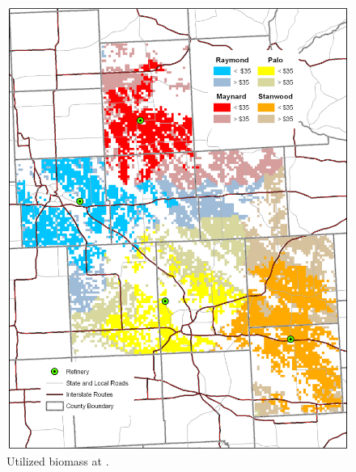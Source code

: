 \documentclass{elsart}
\begin{document}
\begin{figure}[hpt]
  \centering
  \includegraphics[width=1.0\textwidth]{farm_costs_35dollar_divide.png}  
  \caption{Utilized biomass at . }
  \label{fig:util35}
\end{figure}





\nocite{*}
%






\end{document}
